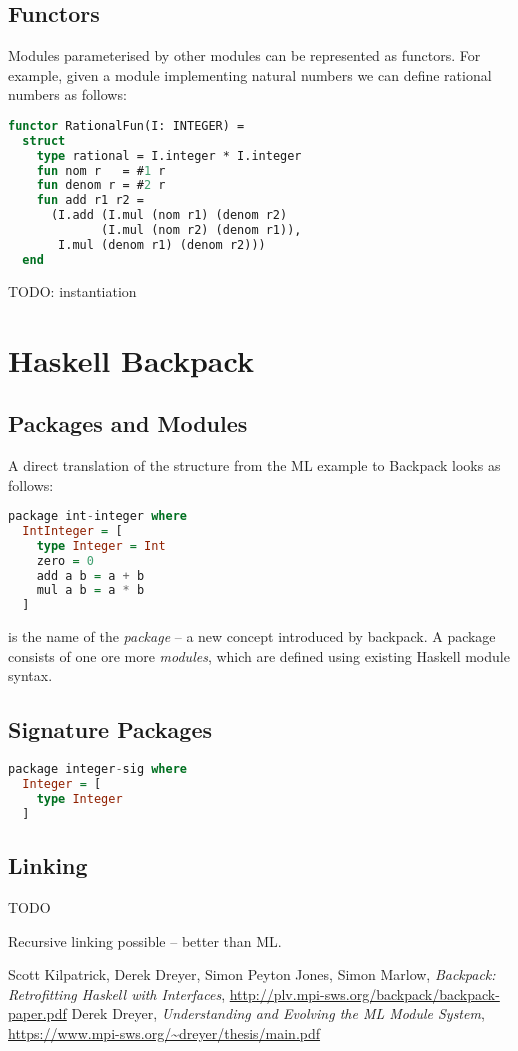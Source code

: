 \documentclass[11pt,twoside,a4paper]{article} %
\begin{document}
\subsection{Functors}

Modules parameterised by other modules can be represented as functors. For example, given a module implementing natural numbers we can define rational numbers as follows:
\begin{lstlisting}[language=ML]
functor RationalFun(I: INTEGER) =
  struct
    type rational = I.integer * I.integer
    fun nom r   = #1 r
    fun denom r = #2 r
    fun add r1 r2 = 
      (I.add (I.mul (nom r1) (denom r2) 
             (I.mul (nom r2) (denom r1)),
       I.mul (denom r1) (denom r2)))
  end
\end{lstlisting}

TODO: instantiation

\section{Haskell Backpack}

\subsection{Packages and Modules}

A direct translation of the  structure from the ML example to Backpack looks as follows:

\begin{lstlisting}[language=Haskell]
package int-integer where
  IntInteger = [
    type Integer = Int
    zero = 0
    add a b = a + b
    mul a b = a * b
  ]
\end{lstlisting}
 is the name of the \emph{package} -- a new concept introduced by backpack. A package consists of one ore more \emph{modules}, which are defined using existing Haskell module syntax.

\subsection{Signature Packages}

\begin{lstlisting}[language=Haskell]
package integer-sig where
  Integer = [
    type Integer
  ]
\end{lstlisting}

\subsection{Linking}

TODO

Recursive linking possible -- better than ML.

\begin{thebibliography}{9}
	 Scott Kilpatrick, Derek Dreyer, Simon Peyton Jones, Simon Marlow, \emph{Backpack: Retrofitting Haskell with Interfaces}, \url{http://plv.mpi-sws.org/backpack/backpack-paper.pdf}
	 Derek Dreyer, \emph{Understanding and Evolving the ML Module System}, \url{https://www.mpi-sws.org/~dreyer/thesis/main.pdf}
\end{thebibliography}
\end{document}
